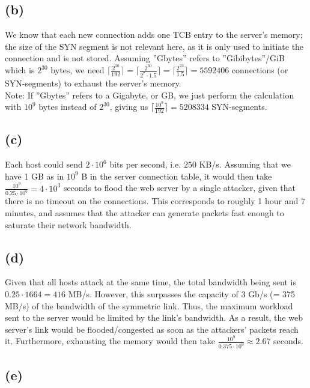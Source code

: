 \documentclass{article}
\begin{document}
\subsection*{(b)}
We know that each new connection adds one TCB entry to the server's memory; the size of the SYN segment is not relevant here, as it is only used to initiate the connection and is not stored. Assuming ''Gbytes'' refers to ''Gibibytes''/GiB which is $2^{30}$ bytes, we need $\lceil \frac{2^{30}}{192} \rceil = \lceil \frac{2^{30}}{2^7 \cdot 1.5} \rceil = \lceil \frac{2^{23}}{1.5} \rceil = 5592406$ connections (or SYN-segments) to exhaust the server's memory. \\
Note: If ''Gbytes'' refers to a Gigabyte, or GB, we just perform the calculation with $10^9$ bytes instead of $2^{30}$, giving us $\lceil \frac{10^9}{192} \rceil = 5208334$ SYN-segments.

\subsection*{(c)}

Each host could send $2\cdot 10^6$ bits per second, i.e. $250$ KB/s.
Assuming that we have 1 GB as in $10^9$ B in the server connection table, it would then take $\frac{10^9}{0.25\cdot 10^6}=4\cdot 10^3$ seconds to flood the web server by a single attacker, given that there is no timeout on the connections.
This corresponds to roughly 1 hour and 7 minutes, and assumes that the attacker can generate packets fast enough to saturate their network bandwidth.

\subsection*{(d)}

Given that all hosts attack at the same time, the total bandwidth being sent is $0.25 \cdot 1664=416$ MB/s.
However, this surpasses the capacity of 3 Gb/s (= 375 MB/s) of the bandwidth of the symmetric link.
Thus, the maximum workload sent to the server would be limited by the link's bandwidth.
As a result, the web server's link would be flooded/congested as soon as the attackers' packets reach it.
Furthermore, exhausting the memory would then take $\frac{10^9}{0.375\cdot 10 ^9}\approx 2.67$ seconds.

\subsection*{(e)}
\end{document}

